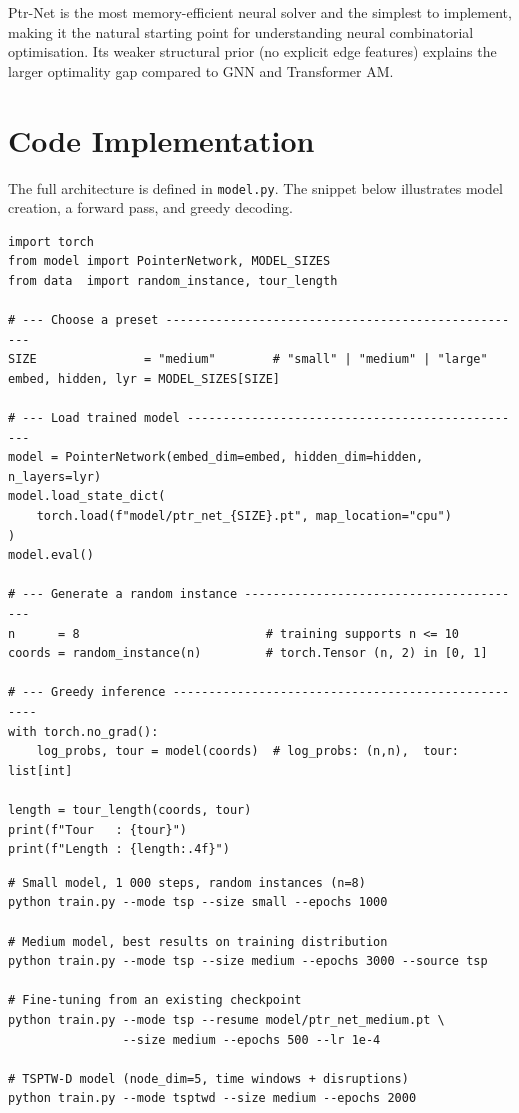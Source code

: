\documentclass[12pt,a4paper]{article}
\begin{document}
Ptr-Net is the most memory-efficient neural solver and the simplest to
implement, making it the natural starting point for understanding neural
combinatorial optimisation.
Its weaker structural prior (no explicit edge features) explains the larger
optimality gap compared to GNN and Transformer AM.

\section{Code Implementation}

The full architecture is defined in \texttt{model.py}.
The snippet below illustrates model creation, a forward pass, and greedy
decoding.

\begin{lstlisting}[style=pythonstyle,
  caption={Creation, inference, and tour decoding
           (\texttt{model.py} + \texttt{data.py})}]
import torch
from model import PointerNetwork, MODEL_SIZES
from data  import random_instance, tour_length

# --- Choose a preset ---------------------------------------------------
SIZE               = "medium"        # "small" | "medium" | "large"
embed, hidden, lyr = MODEL_SIZES[SIZE]

# --- Load trained model ------------------------------------------------
model = PointerNetwork(embed_dim=embed, hidden_dim=hidden, n_layers=lyr)
model.load_state_dict(
    torch.load(f"model/ptr_net_{SIZE}.pt", map_location="cpu")
)
model.eval()

# --- Generate a random instance ----------------------------------------
n      = 8                          # training supports n <= 10
coords = random_instance(n)         # torch.Tensor (n, 2) in [0, 1]

# --- Greedy inference ---------------------------------------------------
with torch.no_grad():
    log_probs, tour = model(coords)  # log_probs: (n,n),  tour: list[int]

length = tour_length(coords, tour)
print(f"Tour   : {tour}")
print(f"Length : {length:.4f}")
\end{lstlisting}

\begin{lstlisting}[style=bashstyle,
  caption={Training from the command line
           (run from \texttt{DL\_MODEL/ptr\_net/})}]
# Small model, 1 000 steps, random instances (n=8)
python train.py --mode tsp --size small --epochs 1000

# Medium model, best results on training distribution
python train.py --mode tsp --size medium --epochs 3000 --source tsp

# Fine-tuning from an existing checkpoint
python train.py --mode tsp --resume model/ptr_net_medium.pt \
                --size medium --epochs 500 --lr 1e-4

# TSPTW-D model (node_dim=5, time windows + disruptions)
python train.py --mode tsptwd --size medium --epochs 2000
\end{lstlisting}
\end{document}
